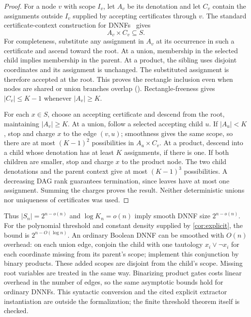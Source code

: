 \documentclass[11pt]{article}
\theoremstyle{plain}
\theoremstyle{definition}
\theoremstyle{remark}
\newcommand{\card}[1]{\lvert #1\rvert}
\begin{document}
\begin{proof}
For a node $v$ with scope $I_v$, let $A_v$ be its denotation and let $C_v$ contain the
assignments outside $I_v$ supplied by accepting certificates through $v$. The standard
certificate-context construction for DNNFs~\cite{BovaEtAl2016} gives
\[
  A_v\times C_v\subseteq S.
\]
For completeness, substitute any assignment in $A_v$ at its occurrence in such a
certificate and ascend toward the root. At a union, membership in the selected child
implies membership in the parent. At a product, the sibling uses disjoint coordinates
and its assignment is unchanged. The substituted assignment is therefore accepted at
the root. This proves the rectangle inclusion even when nodes are shared or union
branches overlap (). Rectangle-freeness gives
$\card{C_v}\le K-1$ whenever $\card{A_v}\ge K$.

For each $x\in S$, choose an accepting certificate and descend from the root, maintaining
$\card{A_v}\ge K$. At a union, follow a selected accepting child $u$. If $\card{A_u}<K$,
stop and charge $x$ to the edge $(v,u)$; smoothness gives the same scope, so there are at
most $(K-1)^2$ possibilities in $A_u\times C_v$. At a product, descend into a child whose
denotation has at least $K$ assignments, if there is one. If both children are smaller,
stop and charge $x$ to the product node. The two child denotations and the parent context
give at most $(K-1)^3$ possibilities. A decreasing DAG rank guarantees termination, since
leaves have at most one assignment. Summing the charges proves the result. Neither
deterministic unions nor uniqueness of certificates was used.
\end{proof}

Thus $\card{S_n}=2^{n-o(n)}$ and $\log K_n=o(n)$ imply smooth DNNF size $2^{n-o(n)}$.
For the polynomial threshold and constant density supplied by \cref{cor:explicit}, the
bound is $2^{n-O(\log n)}$. An ordinary Boolean DNNF can be smoothed with $O(n)$ overhead:
on each union edge, conjoin the child with one tautology $x_i\vee\neg x_i$ for each
coordinate missing from its parent's scope; implement this conjunction by binary
products. These added scopes are disjoint from the child's scope. Missing root variables
are treated in the same way. Binarizing product gates costs linear overhead in the number
of edges, so the same asymptotic bounds hold for ordinary DNNFs. This syntactic conversion
and the cited explicit extractor instantiation are outside the formalization; the finite
threshold theorem itself is checked.
\end{document}
